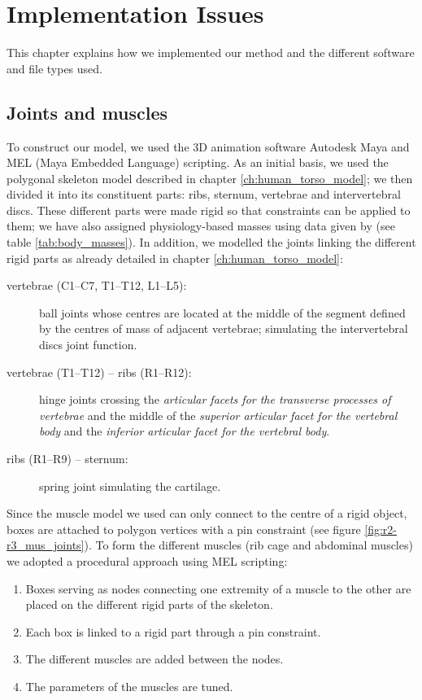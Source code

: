 \chapter{\label{ch:implementation_issues}Implementation Issues}
This chapter explains how we implemented our method and the different software and file types used.

\section{Joints and muscles}
To construct our model, we used the 3D animation software Autodesk Maya and MEL (Maya Embedded Language) scripting. As an initial basis, we used the polygonal skeleton model described in chapter \ref{ch:human_torso_model}; we then divided it into its constituent parts: ribs, sternum, vertebrae and intervertebral discs. These different parts were made rigid so that constraints can be applied to them; we have also assigned physiology-based masses using data given by \cite{dilorenzo2009breathing} (see table \ref{tab:body_masses}). In addition, we modelled the joints linking the different rigid parts as already detailed in chapter \ref{ch:human_torso_model}:

\begin{description}
\item[vertebrae (C1--C7, T1--T12, L1--L5):] ball joints whose centres are located at the middle of the segment defined by the centres of mass of adjacent vertebrae; simulating the intervertebral discs joint function.
\item[vertebrae (T1--T12) -- ribs (R1--R12):] hinge joints crossing the \emph{articular facets for the transverse processes of vertebrae} and the middle of the \emph{superior articular facet for the vertebral body} and the \emph{inferior articular facet for the vertebral body}.
\item[ribs (R1--R9) -- sternum:] spring joint simulating the cartilage.
\end{description}

Since the muscle model we used can only connect to the centre of a rigid object, boxes are attached to polygon vertices with a pin constraint (see figure \ref{fig:r2-r3_mus_joints}). To form the different muscles (rib cage and abdominal muscles) we adopted a procedural approach using MEL scripting: 

\begin{enumerate}
\item Boxes serving as nodes connecting one extremity of a muscle to the other are placed on the different rigid parts of the skeleton.
\item Each box is linked to a rigid part through a pin constraint.
\item The different muscles are added between the nodes.
\item The parameters of the muscles are tuned.
\end{enumerate}

